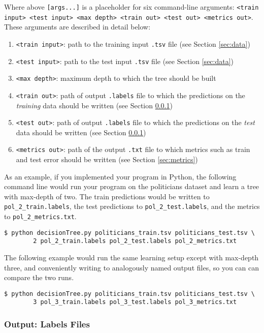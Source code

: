 Where above \lstinline{[args...]} is a placeholder for six command-line arguments: 
\texttt{<train input> <test input> <max depth> <train out> <test out> <metrics out>}. These arguments are described in detail below:
\begin{enumerate}
\item \lstinline{<train input>}: path to the training input \lstinline{.tsv} file (see Section \ref{sec:data})
\item \lstinline{<test input>}: path to the test input \lstinline{.tsv} file (see Section \ref{sec:data})
\item \lstinline{<max depth>}: maximum depth to which the tree should be built
\item \lstinline{<train out>}: path of output \lstinline{.labels} file to which the predictions on the \textit{training} data should be written (see Section \ref{sec:labels})
\item \lstinline{<test out>}: path of output \lstinline{.labels} file to which the predictions on the \emph{test} data should be written (see Section \ref{sec:labels})
\item \lstinline{<metrics out>}: path of the output \lstinline{.txt} file to which metrics such as train and test error should be written (see Section \ref{sec:metrics})
\end{enumerate}

As an example, if you implemented your program in Python, the following command line would run your program on the politicians dataset and learn a tree with max-depth of two. The train predictions would be written to \lstinline{pol_2_train.labels}, the test predictions to \lstinline{pol_2_test.labels}, and the metrics to \lstinline{pol_2_metrics.txt}.
%
\begin{lstlisting}[language=Shell]
$ python decisionTree.py politicians_train.tsv politicians_test.tsv \ 
        2 pol_2_train.labels pol_2_test.labels pol_2_metrics.txt
\end{lstlisting}
%
The following example would run the same learning setup except with max-depth three, and conveniently writing to analogously named output files, so you can can compare the two runs.
%
\begin{lstlisting}[language=Shell]
$ python decisionTree.py politicians_train.tsv politicians_test.tsv \ 
        3 pol_3_train.labels pol_3_test.labels pol_3_metrics.txt
\end{lstlisting}

\subsubsection{Output: Labels Files}
\label{sec:labels}

